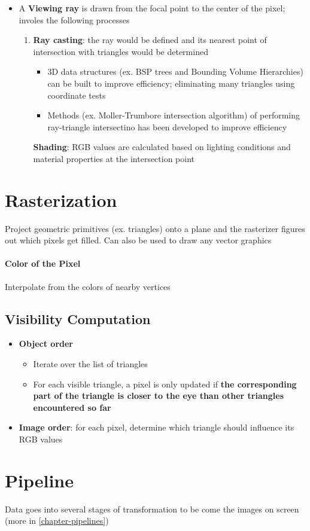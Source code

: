       \begin{itemize}
        \item A \textbf{Viewing ray} is drawn from the focal point to the center
        of the pixel; involes the following processes
        \begin{enumerate}
          \item \textbf{Ray casting}: the ray would be defined and its nearest
          point of intersection with triangles would be determined
          \begin{itemize}
            \item 3D data structures (ex. BSP trees and
            Bounding Volume Hierarchies) can be built to improve efficiency;
            eliminating many triangles using coordinate tests
            \item Methods (ex. Moller-Trumbore intersection algorithm) of performing ray-triangle intersectino has been
            developed to improve efficiency
          \end{itemize}
          \textbf{Shading}: RGB values are calculated based on lighting
          conditions and material properties at the intersection point
        \end{enumerate}
      \end{itemize}

\section{Rasterization}

  Project geometric primitives (ex. triangles) onto a plane and the rasterizer
  figures out which pixels get filled. Can also be used to draw any vector
  graphics

  \paragraph{Color of the Pixel}
  Interpolate from the colors of nearby vertices

  \subsection{Visibility Computation}

    \begin{itemize}
      \item \textbf{Object order}
      \begin{itemize}
        \item Iterate over the list of triangles
        \item For each visible triangle, a pixel is only updated if \textbf{
        the corresponding part of the triangle is closer to the eye than
        other triangles encountered so far}
      \end{itemize}
      \item \textbf{Image order}: for each pixel, determine which triangle should
      influence its RGB values
    \end{itemize}

\section{Pipeline}

  Data goes into several stages of transformation to be come the images on
  screen (more in \ref{chapter-pipelines})
